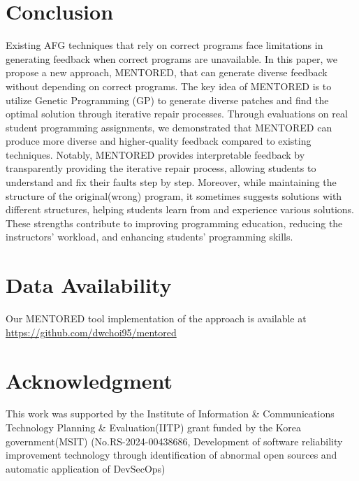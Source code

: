 \documentclass[10pt,conference]{IEEEtran}
\begin{document}
\section{Conclusion}
    Existing AFG techniques that rely on correct programs face limitations in generating feedback when correct programs are unavailable. In this paper, we propose a new approach, MENTORED, that can generate diverse feedback without depending on correct programs. The key idea of MENTORED is to utilize Genetic Programming (GP) to generate diverse patches and find the optimal solution through iterative repair processes. Through evaluations on real student programming assignments, we demonstrated that MENTORED can produce more diverse and higher-quality feedback compared to existing techniques. Notably, MENTORED provides interpretable feedback by transparently providing the iterative repair process, allowing students to understand and fix their faults step by step. Moreover, while maintaining the structure of the original(wrong) program, it sometimes suggests solutions with different structures, helping students learn from and experience various solutions. These strengths contribute to improving programming education, reducing the instructors' workload, and enhancing students' programming skills.



\section{Data Availability} \label{tool}
    Our MENTORED tool implementation of the approach is available at \url{https://github.com/dwchoi95/mentored}



\section*{Acknowledgment}
    This work was supported by the Institute of Information \& Communications Technology Planning \& Evaluation(IITP) grant funded by the Korea government(MSIT) (No.RS-2024-00438686, Development of software reliability improvement technology through identification of abnormal open sources and automatic application of DevSecOps)




\end{document}
